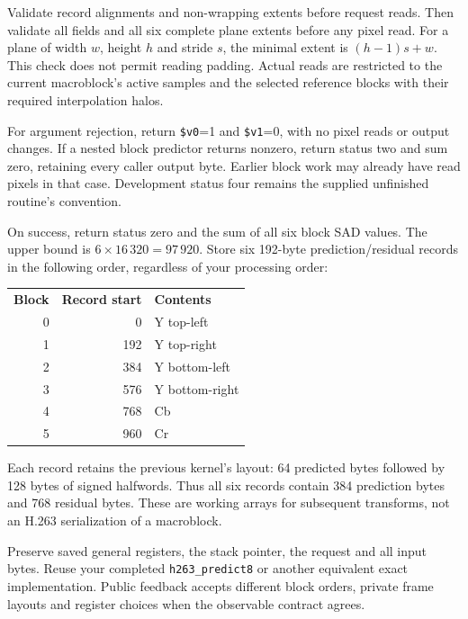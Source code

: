 Validate record alignments and non-wrapping extents before request reads. Then
validate all fields and all six complete plane extents before any pixel read.
For a plane of width $w$, height $h$ and stride $s$, the minimal extent is
$(h-1)s+w$. This check does not permit reading padding. Actual reads are restricted
to the current macroblock's active samples and the selected reference blocks
with their required interpolation halos.

For argument rejection, return \texttt{\$v0}=1 and \texttt{\$v1}=0, with no
pixel reads or output changes. If a nested block predictor returns nonzero,
return status two and sum zero, retaining every caller output byte. Earlier
block work may already have read pixels in that case. Development status four
remains the supplied unfinished routine's convention.

On success, return status zero and the sum of all six block SAD values.
The upper bound is $6\times16\,320=97\,920$. Store six 192-byte prediction/residual
records in the following order, regardless of your processing order:
\begin{center}
\begin{tabular}{rrl}
\textbf{Block} & \textbf{Record start} & \textbf{Contents}\\
0 & 0 & Y top-left\\
1 & 192 & Y top-right\\
2 & 384 & Y bottom-left\\
3 & 576 & Y bottom-right\\
4 & 768 & Cb\\
5 & 960 & Cr
\end{tabular}
\end{center}
Each record retains the previous kernel's layout: 64 predicted bytes followed
by 128 bytes of signed halfwords. Thus all six records contain 384 prediction
bytes and 768 residual bytes. These are working arrays for subsequent transforms,
not an H.263 serialization of a macroblock.

Preserve saved general registers, the stack pointer, the request and all input
bytes. Reuse your completed \texttt{h263\_predict8} or another equivalent exact
implementation. Public feedback accepts different block orders, private frame
layouts and register choices when the observable contract agrees.
